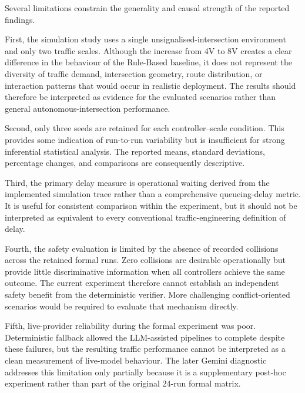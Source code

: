 \documentclass[letterpaper,10pt,conference]{ieeeconf}
\begin{document}
Several limitations constrain the generality and causal strength of the reported findings.



First, the simulation study uses a single unsignalised-intersection environment and only two traffic scales. Although the increase from 4V to 8V creates a clear difference in the behaviour of the Rule-Based baseline, it does not represent the diversity of traffic demand, intersection geometry, route distribution, or interaction patterns that would occur in realistic deployment. The results should therefore be interpreted as evidence for the evaluated scenarios rather than general autonomous-intersection performance.



Second, only three seeds are retained for each controller--scale condition. This provides some indication of run-to-run variability but is insufficient for strong inferential statistical analysis. The reported means, standard deviations, percentage changes, and comparisons are consequently descriptive.



Third, the primary delay measure is operational waiting derived from the implemented simulation trace rather than a comprehensive queueing-delay metric. It is useful for consistent comparison within the experiment, but it should not be interpreted as equivalent to every conventional traffic-engineering definition of delay.



Fourth, the safety evaluation is limited by the absence of recorded collisions across the retained formal runs. Zero collisions are desirable operationally but provide little discriminative information when all controllers achieve the same outcome. The current experiment therefore cannot establish an independent safety benefit from the deterministic verifier. More challenging conflict-oriented scenarios would be required to evaluate that mechanism directly.



Fifth, live-provider reliability during the formal experiment was poor. Deterministic fallback allowed the LLM-assisted pipelines to complete despite these failures, but the resulting traffic performance cannot be interpreted as a clean measurement of live-model behaviour. The later Gemini diagnostic addresses this limitation only partially because it is a supplementary post-hoc experiment rather than part of the original 24-run formal matrix.
\end{document}
